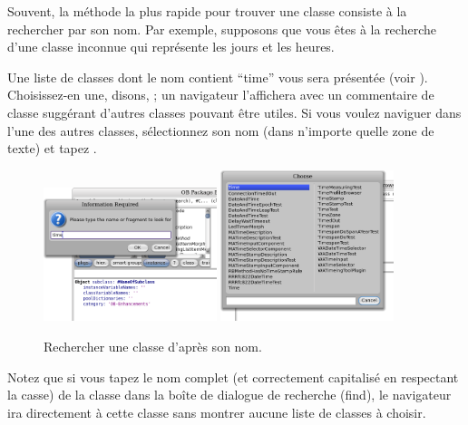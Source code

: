 \documentclass[a4paper,10pt,twoside]{book}
\begin{document}
Souvent, la méthode la plus rapide pour trouver une classe consiste
à la rechercher par son nom. Par exemple, supposons que vous êtes
à la recherche d'une classe inconnue qui représente les jours et
les heures.%

\noindent
Une liste de classes dont le nom contient ``time'' vous sera
présentée (voir ). Choisissez-en une, disons,
\mbox{;} 
un navigateur l'affichera avec un commentaire de classe
suggérant d'autres classes pouvant être utiles. Si vous voulez
naviguer dans l'une des autres classes, sélectionnez son nom (dans
n'importe quelle zone de texte) et tapez .

\begin{figure}[hbt]
\centerline{
	\includegraphics[width=0.45\textwidth]{FindIt}
	\hspace{1cm}
	\includegraphics[width=0.45\textwidth]{TimeClasses}
}
\caption{Rechercher une classe d'après son nom.}
\end{figure}

Notez que si vous tapez le nom complet (et correctement capitalisé 
\cad en respectant la casse)
de la classe dans la boîte de dialogue de recherche (find), le
navigateur ira directement à cette classe sans montrer aucune liste
de classes à choisir.
\end{document}
